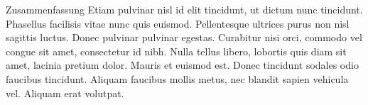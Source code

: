 \begin{coverpage}{Zusammenfassung}
Etiam pulvinar nisl id elit tincidunt, ut dictum nunc tincidunt. Phasellus facilisis vitae nunc quis euismod. Pellentesque ultrices purus non nisl sagittis luctus. Donec pulvinar pulvinar egestas. Curabitur nisi orci, commodo vel congue sit amet, consectetur id nibh. Nulla tellus libero, lobortis quis diam sit amet, lacinia pretium dolor. Mauris et euismod est. Donec tincidunt sodales odio faucibus tincidunt. Aliquam faucibus mollis metus, nec blandit sapien vehicula vel. Aliquam erat volutpat.
\end{coverpage}
